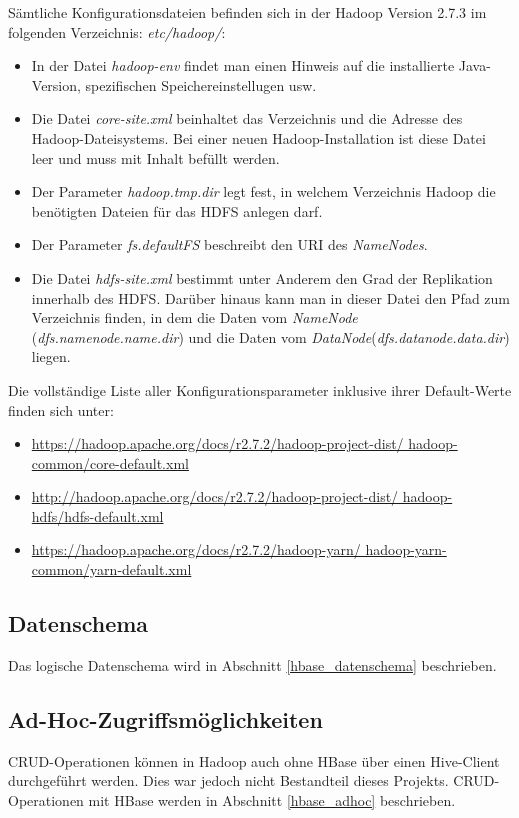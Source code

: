 Sämtliche Konfigurationsdateien befinden sich in der Hadoop Version 2.7.3 im folgenden Verzeichnis: \textit{etc/hadoop/}:
\begin{itemize}
\item In der Datei \textit{hadoop-env} findet man einen Hinweis auf die installierte Java-Version, spezifischen Speichereinstellugen usw. 
\item Die Datei \textit{core-site.xml} beinhaltet das Verzeichnis und die Adresse des Hadoop-Dateisystems. Bei einer neuen Hadoop-Installation ist diese Datei leer und muss mit Inhalt befüllt werden.
\item Der Parameter \textit{hadoop.tmp.dir} legt fest, in welchem Verzeichnis Hadoop die benötigten Dateien für das HDFS anlegen darf.
\item Der Parameter \textit{fs.defaultFS} beschreibt den \ac{URI} des \textit{NameNodes}.
\item Die Datei \textit{hdfs-site.xml} bestimmt unter Anderem den Grad der Replikation innerhalb des \ac{HDFS}. Darüber hinaus kann man in dieser Datei den Pfad zum Verzeichnis finden, in dem die Daten vom \textit{NameNode} (\textit{dfs.namenode.name.dir}) und die Daten vom \textit{DataNode}(\textit{dfs.datanode.data.dir}) liegen.
\end{itemize}

Die vollständige Liste aller Konfigurationsparameter inklusive ihrer Default-Werte finden sich unter:

\begin{itemize}
	\item \url{https://hadoop.apache.org/docs/r2.7.2/hadoop-project-dist/
	hadoop-common/core-default.xml}
	\item \url{http://hadoop.apache.org/docs/r2.7.2/hadoop-project-dist/
	hadoop-hdfs/hdfs-default.xml}
	\item \url{https://hadoop.apache.org/docs/r2.7.2/hadoop-yarn/
	hadoop-yarn-common/yarn-default.xml}
\end{itemize}


\subsection{Datenschema}
Das logische Datenschema wird in Abschnitt \ref{hbase_datenschema}  beschrieben.


\subsection{Ad-Hoc-Zugriffsmöglichkeiten}
CRUD-Operationen können in Hadoop auch ohne HBase über einen Hive-Client durchgeführt werden. Dies war jedoch nicht Bestandteil dieses Projekts. CRUD-Operationen mit HBase werden in Abschnitt \ref{hbase_adhoc} beschrieben.
